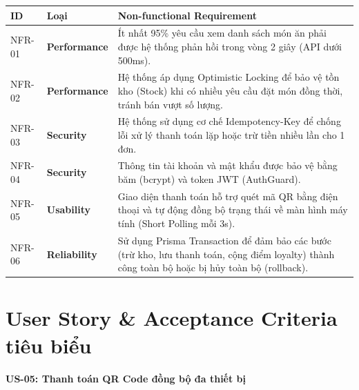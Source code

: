 \small
\begin{tabularx}{\textwidth}{
@{}p{1.2cm}
>{\RaggedRight\arraybackslash\bfseries}p{2.2cm}
>{\RaggedRight\arraybackslash}X@{}
}
\toprule
\rowcolor{tableblue}
ID & Loại & Non-functional Requirement \\
\midrule

NFR-01 &
Performance &
Ít nhất 95\% yêu cầu xem danh sách món ăn phải được hệ thống
phản hồi trong vòng 2 giây (API dưới 500ms). \\

\midrule

NFR-02 &
Performance &
Hệ thống áp dụng Optimistic Locking để bảo vệ tồn kho (Stock) khi có 
nhiều yêu cầu đặt món đồng thời, tránh bán vượt số lượng. \\

\midrule

NFR-03 &
Security &
Hệ thống sử dụng cơ chế Idempotency-Key để chống lỗi 
xử lý thanh toán lặp hoặc trừ tiền nhiều lần cho 1 đơn. \\

\midrule

NFR-04 &
Security &
Thông tin tài khoản và mật khẩu được bảo vệ
bằng băm (bcrypt) và token JWT (AuthGuard). \\

\midrule

NFR-05 &
Usability &
Giao diện thanh toán hỗ trợ quét mã QR bằng điện thoại 
và tự động đồng bộ trạng thái về màn hình máy tính (Short Polling mỗi 3s). \\

\midrule

NFR-06 &
Reliability &
Sử dụng Prisma Transaction để đảm bảo các bước (trừ kho, lưu thanh toán, 
cộng điểm loyalty) thành công toàn bộ hoặc bị hủy toàn bộ (rollback). \\

\bottomrule
\end{tabularx}

\normalsize


\section{User Story \& Acceptance Criteria tiêu biểu}

\vspace{8pt}

\textbf{\large US-05: Thanh toán QR Code đồng bộ đa thiết bị}

\vspace{12pt}

